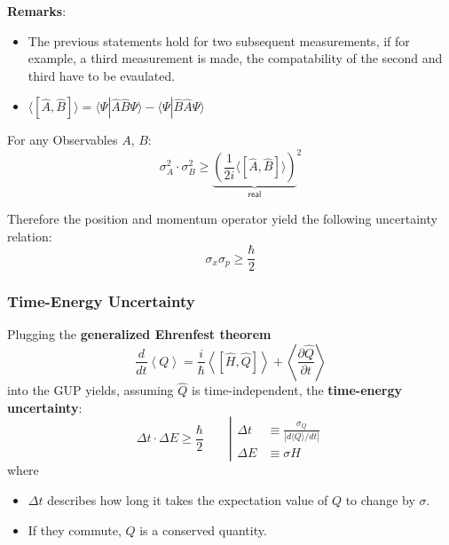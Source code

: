 \textbf{Remarks}:
\begin{itemize}
    \item The previous statements hold for two subsequent measurements, if for example, a third measurement is made, the compatability of the second and third have to be evaulated.
    \item $\langle[\hat{A},\hat{B}]\rangle=\langle\Psi|\hat{A}\hat{B}\Psi\rangle-\langle\Psi|\hat{B}\hat{A}\Psi\rangle$
\end{itemize}

\newpar{}

For any Observables $A$, $B$:
\begin{equation*}
    \sigma_A^2\cdot\sigma_B^2\geqslant{\underbrace{\left(\frac1{2i}\langle[\hat{A},\hat{B}]\rangle\right)}_{\textsf{real}}}^2
\end{equation*}

Therefore the position and momentum operator yield the following uncertainty relation:
\begin{equation*}
    \sigma_x\sigma_p \geq \frac{\hbar}{2}
\end{equation*}

\subsubsection{Time-Energy Uncertainty}
Plugging the \textbf{generalized Ehrenfest theorem}
\begin{equation*}
    \frac{d}{dt}\left\langle Q\right\rangle=\frac{i}{\hbar}\left\langle\left[\hat{H},\hat{Q}\right]\right\rangle+\left\langle\frac{\partial\hat{Q}}{\partial t}\right\rangle
\end{equation*}
into the GUP yields, assuming $\hat{Q}$ is time-independent, the \textbf{time-energy uncertainty}:
\begin{equation*}
    \Delta t\cdot\Delta E\geqslant\frac\hbar2 \qquad \left|\begin{matrix}
        \Delta t & \equiv \frac{\sigma_Q}{|d\langle Q\rangle/dt|} \\
        \Delta E & \equiv \sigma H
    \end{matrix}\right.
\end{equation*}
where


\begin{itemize}
    \item $\Delta t$ describes how long it takes the expectation value of $Q$ to change by $\sigma$.
    \item If they commute, $Q$ is a conserved quantity.
\end{itemize}


